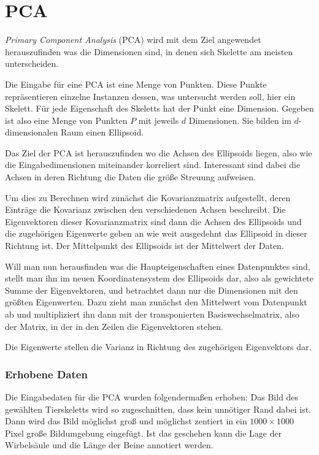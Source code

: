 \chapter{PCA}

 \emph{Primary Component Analysis} (PCA) wird mit dem Ziel angewendet herauszufinden was die Dimensionen sind, in denen sich Skelette am meisten unterscheiden.
 
 Die Eingabe für eine PCA ist eine Menge von Punkten. Diese Punkte repräsentieren einzelne Instanzen dessen, was untersucht werden soll, hier ein Skelett. Für jede Eigenschaft des Skeletts hat der Punkt eine Dimension. Gegeben ist also eine Menge von Punkten $P$ mit jeweils $d$ Dimensionen. Sie bilden im $d$-dimensionalen Raum einen Ellipsoid.
 
 Das Ziel der PCA ist herauszufinden wo die Achsen des Ellipsoids liegen, also wie die Eingabedimensionen miteinander korreliert sind. Interessant sind dabei die Achsen in deren Richtung die Daten die größe Streuung aufweisen.
 
 Um dies zu Berechnen wird zunächst die Kovarianzmatrix aufgestellt, deren Einträge die Kovarianz zwischen den verschiedenen Achsen beschreibt.
 Die Eigenvektoren dieser Kovarianzmatrix sind dann die Achsen des Ellipsoids und die zugehörigen Eigenwerte geben an wie weit ausgedehnt das Ellipsoid in dieser Richtung ist. Der Mittelpunkt des Ellipsoids ist der Mittelwert der Daten.
 
 Will man nun herausfinden was die Haupteigenschaften eines Datenpunktes sind, stellt man ihn im neuen Koordinatensystem des Ellipsoids dar, also als gewichtete Summe der Eigenvektoren, und betrachtet dann nur die Dimensionen mit den größten Eigenwerten. Dazu zieht man zunächst den Mittelwert vom Datenpunkt ab und multipliziert ihn dann mit der transponierten Basiswechselmatrix, also der Matrix, in der in den Zeilen die Eigenvektoren stehen.
 
 Die Eigenwerte stellen die Varianz in Richtung des zugehörigen Eigenvektors dar. 

 \subsection{Erhobene Daten}
 
 Die Eingabedaten für die PCA wurden folgendermaßen erhoben:
 Das Bild des gewählten Tierskeletts wird so zugeschnitten, dass kein unnötiger Rand dabei ist. Dann wird das Bild möglichst groß und möglichst zentiert in ein $1000 \times 1000$ Pixel große Bildumgebung eingefügt.
 Ist das geschehen kann die Lage der Wirbelsäule und die Länge der Beine annotiert werden.
 
